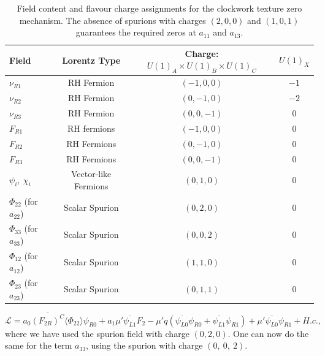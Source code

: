 \documentclass[11pt,letterpaper]{article}
\begin{document}
\begin{table}[h]
    \centering
    \renewcommand{\arraystretch}{1.3}
    \begin{tabular}{@{} l c c c @{}}
    \toprule
    \textbf{Field} & \textbf{Lorentz Type} & \textbf{Charge: $U(1)_A \times U(1)_B \times U(1)_C$} & $U(1)_X$ \\
    \midrule
    $\nu_{R1}$ & RH Fermion & $(-1, 0, 0)$ & $-1$ \\
    $\nu_{R2}$ & RH Fermion & $(0, -1, 0)$ & $-2$\\
    $\nu_{R3}$ & RH Fermion & $(0, 0, -1)$ & $0$\\
    \midrule
    $F_{R1}$ & RH fermions & $(-1, 0, 0)$ & $0$\\
    $F_{R2}$ & RH Fermions & $(0, -1, 0)$& $0$ \\
    $F_{R3}$ & RH Fermions & $(0, 0, -1)$ & $0$\\
    \midrule
    $\psi_i,\ \chi_i$ & Vector-like Fermions & $(0, 1, 0)$ & $0$\\
    \midrule
    $\Phi_{22}$ (for $a_{22}$) & Scalar Spurion & $(0, 2, 0)$ & $0$\\
    $\Phi_{33}$ (for $a_{33}$) & Scalar Spurion & $(0, 0, 2)$ & $0$\\
    $\Phi_{12}$ (for $a_{12}$) & Scalar Spurion & $(1, 1, 0)$ & $0$\\
    $\Phi_{23}$ (for $a_{23}$) & Scalar Spurion & $(0, 1, 1)$ & $0$\\
    \bottomrule
    \end{tabular}
    \caption{Field content and flavour charge assignments for the clockwork texture zero mechanism. The absence of spurions with charges $(2,0,0)$ and $(1,0,1)$ guarantees the required zeros at $a_{11}$ and $a_{13}$.}
    \label{tab:clockwork_charges}
\end{table}
\begin{equation} \label{eqn:IOCMdirect}
    \mathcal{L} = a_{0} \overline{(F_{2R})^C} \langle\Phi_{22}\rangle \psi_{R0} + a_1 \mu' \overline{\psi_{L1}} F_2 - \mu' q(\overline{\psi_{L0}}\psi_{R0} + \overline{\psi_{L1}}\psi_{R1}) + \mu'  \overline{\psi_{L0}} \psi_{R1} + H.c.,
\end{equation}
where we have used the spurion field with charge $(0,2,0)$. One can now do the
same for the term $a_{33}$, using the spurion with charge $(0,\ 0,\ 2)$. 
\end{document}
